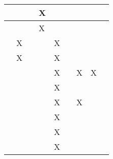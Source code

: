 \begin{longtable}{|l|llllllll|}
    \cite[]{Ayala.2020}           & \multicolumn{1}{l|}{}   & \multicolumn{1}{l|}{}    & \multicolumn{1}{l|}{X}   & \multicolumn{1}{l|}{}   & \multicolumn{1}{l|}{}   & \multicolumn{1}{l|}{}   & \multicolumn{1}{l|}{}     &    \\ \hline
    \cite[]{Todorov.2012}         & \multicolumn{1}{l|}{}   & \multicolumn{1}{l|}{}    & \multicolumn{1}{l|}{X}   & \multicolumn{1}{l|}{}   & \multicolumn{1}{l|}{}   & \multicolumn{1}{l|}{}   & \multicolumn{1}{l|}{}     &    \\ \hline
    \cite[]{Koch.2018}            & \multicolumn{1}{l|}{X}   & \multicolumn{1}{l|}{}    & \multicolumn{1}{l|}{}   & \multicolumn{1}{l|}{X}   & \multicolumn{1}{l|}{}   & \multicolumn{1}{l|}{}   & \multicolumn{1}{l|}{}     &    \\ \hline
    \cite[]{Deshpande.2020}       & \multicolumn{1}{l|}{X}   & \multicolumn{1}{l|}{}    & \multicolumn{1}{l|}{}   & \multicolumn{1}{l|}{X}   & \multicolumn{1}{l|}{}   & \multicolumn{1}{l|}{}   & \multicolumn{1}{l|}{}     &    \\ \hline
    \cite[]{Deshpande.2021}       & \multicolumn{1}{l|}{}   & \multicolumn{1}{l|}{}    & \multicolumn{1}{l|}{}   & \multicolumn{1}{l|}{X}   & \multicolumn{1}{l|}{}   & \multicolumn{1}{l|}{X}   & \multicolumn{1}{l|}{X}     &    \\ \hline
    \cite[]{Hentati.2018}         & \multicolumn{1}{l|}{}   & \multicolumn{1}{l|}{}    & \multicolumn{1}{l|}{}   & \multicolumn{1}{l|}{X}   & \multicolumn{1}{l|}{}   & \multicolumn{1}{l|}{}   & \multicolumn{1}{l|}{}     &    \\ \hline
    \cite[]{Molchanov.2019}       & \multicolumn{1}{l|}{}   & \multicolumn{1}{l|}{}    & \multicolumn{1}{l|}{}   & \multicolumn{1}{l|}{X}   & \multicolumn{1}{l|}{}   & \multicolumn{1}{l|}{X}   & \multicolumn{1}{l|}{}     &    \\ \hline
    \cite[]{Furrer.2016}          & \multicolumn{1}{l|}{}   & \multicolumn{1}{l|}{}    & \multicolumn{1}{l|}{}   & \multicolumn{1}{l|}{X}   & \multicolumn{1}{l|}{}   & \multicolumn{1}{l|}{}   & \multicolumn{1}{l|}{}     &    \\ \hline
    \cite[]{Silano.2020}          & \multicolumn{1}{l|}{}   & \multicolumn{1}{l|}{}    & \multicolumn{1}{l|}{}   & \multicolumn{1}{l|}{X}   & \multicolumn{1}{l|}{}   & \multicolumn{1}{l|}{}   & \multicolumn{1}{l|}{}     &    \\ \hline
    \cite[]{Shah.2017}            & \multicolumn{1}{l|}{}   & \multicolumn{1}{l|}{}    & \multicolumn{1}{l|}{}   & \multicolumn{1}{l|}{X}   & \multicolumn{1}{l|}{}   & \multicolumn{1}{l|}{}   & \multicolumn{1}{l|}{}     &    \\ \hline

\end{longtable}

